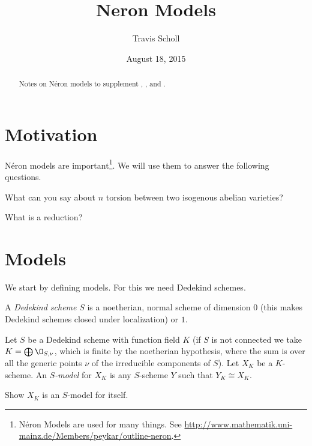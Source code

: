 \documentclass[11pt]{article}
\newcommand{\mytitle}{Neron Models}
\newcommand{\myauthor}{Travis Scholl}
\newcommand{\neron}{N\'{e}ron }
\begin{document}
\title{\mytitle}
\author{\sc \myauthor }
\date{August 18, 2015}
\maketitle

\begin{abstract}
	Notes on \neron models to supplement \cite{milneAV}, \cite{bosch2012neron}, and \cite{silverman1994advanced}.
\end{abstract}

\section{Motivation}

\neron models are important\footnote{\neron Models are used for many things. See {\url{http://www.mathematik.uni-mainz.de/Members/peykar/outline-neron}}.}. We will use them to answer the following questions.

\begin{quest}
	What can you say about $n$ torsion between two isogenous abelian varieties?
\end{quest}
\begin{quest}
	What is a reduction?
\end{quest}

\section{Models}

We start by defining models. For this we need Dedekind schemes.

\begin{defn}
	A \emph{Dedekind scheme} $S$ is a noetherian, normal scheme of dimension $0$ (this makes Dedekind schemes closed under localization) or $1$.
\end{defn}

\begin{defn}
	Let $S$ be a Dedekind scheme with function field $K$ (if $S$ is not connected we take $K = \bigoplus \O_{S,\nu}$, which is finite by the noetherian hypothesis, where the sum is over all the generic points $\nu$ of the irreducible components of $S$). Let $X_K$ be a $K$-scheme. An \emph{$S$-model} for $X_K$ is any $S$-scheme $Y$ such that $Y_K \cong X_K$.
\end{defn}

\begin{excer}
	Show $X_K$ is an $S$-model for itself.
\end{excer}
\end{document}
